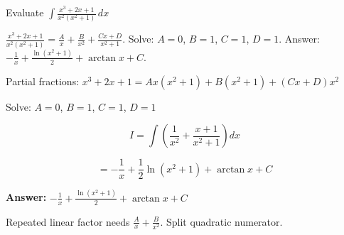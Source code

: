 \vspace{1cm}%
\begin{problem}
Evaluate $\displaystyle \int \frac{x^3 + 2x + 1}{x^2(x^2 + 1)} \, dx$
\end{problem}

\begin{hint}
$\frac{x^3 + 2x + 1}{x^2(x^2+1)} = \frac{A}{x} + \frac{B}{x^2} + \frac{Cx + D}{x^2+1}$. Solve: $A=0$, $B=1$, $C=1$, $D=1$. Answer: $-\frac{1}{x} + \frac{\ln(x^2+1)}{2} + \arctan x + C$.
\end{hint}

\begin{solution}
Partial fractions: $x^3+2x+1 = Ax(x^2+1) + B(x^2+1) + (Cx+D)x^2$

Solve: $A=0$, $B=1$, $C=1$, $D=1$

\[
I = \int\left(\frac{1}{x^2} + \frac{x+1}{x^2+1}\right)dx
\]

\[
= -\frac{1}{x} + \frac{1}{2}\ln(x^2+1) + \arctan x + C
\]

\textbf{Answer:} $\boxed{-\frac{1}{x} + \frac{\ln(x^2+1)}{2} + \arctan x + C}$
\end{solution}

\begin{takeaways}
Repeated linear factor needs $\frac{A}{x} + \frac{B}{x^2}$. Split quadratic numerator.
\end{takeaways}

\vspace{1cm}

